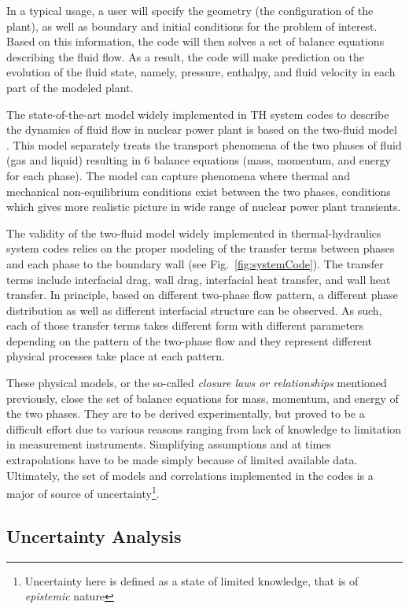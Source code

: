 \documentclass[11pt,titlepage]{article}
\begin{document}
In a typical usage, a user will specify the geometry (the configuration of the plant), as well as boundary and initial conditions for the problem of interest.
Based on this information, the code will then solves a set of balance equations describing the fluid flow.
As a result, the code will make prediction on the evolution of the fluid state, namely, pressure, enthalpy, and fluid velocity in each part of the modeled plant.

The state-of-the-art model widely implemented in TH system codes to describe the dynamics of fluid flow in nuclear power plant is based on the two-fluid model \cite{Ishii2011}.
This model separately treats the transport phenomena of the two phases of fluid (gas and liquid) resulting in 6 balance equations (mass, momentum, and energy for each phase).
The model can capture phenomena where thermal and mechanical non-equilibrium conditions exist between the two phases, conditions which gives more realistic picture in wide range of nuclear power plant transients.

The validity of the two-fluid model widely implemented in thermal-hydraulics system codes relies on the proper modeling of the transfer terms between phases and each phase to the boundary wall (see Fig.~\ref{fig:systemCode}).
The transfer terms include interfacial drag, wall drag, interfacial heat transfer, and wall heat transfer.
In principle, based on different two-phase flow pattern, a different phase distribution as well as different interfacial structure can be observed.
As such, each of those transfer terms takes different form with different parameters depending on the pattern of the two-phase flow and they represent different physical processes take place at each pattern.
 
These physical models, or the so-called \emph{closure laws or relationships} mentioned previously, close the set of balance equations for mass, momentum, and energy of the two phases.
They are to be derived experimentally, but proved to be a difficult effort \cite{Nelson1992,Wulff2007} due to various reasons ranging from lack of knowledge to limitation in measurement instruments. 
Simplifying assumptions and at times extrapolations have to be made simply because of limited available data. 
Ultimately, the set of models and correlations implemented in the codes is a major of source of uncertainty\footnote{Uncertainty here is defined as a state of limited knowledge, that is of \emph{epistemic} nature}.

\subsection{Uncertainty Analysis} 
\end{document}

